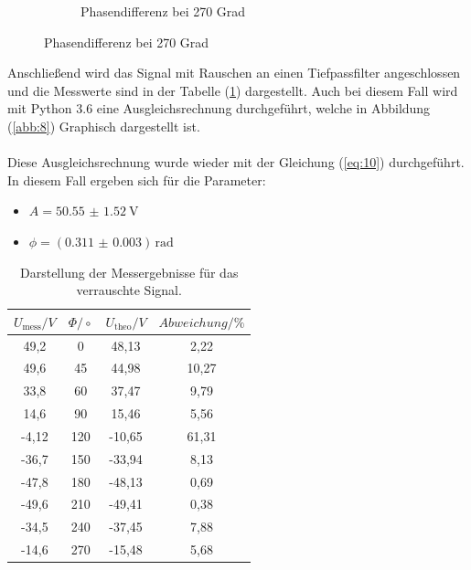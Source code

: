 \begin{figure}[H]
\begin{subfigure}{0.48\textwidth}
  \caption{Phasendifferenz bei 270 Grad}
\end{subfigure}
\end{figure}

Anschließend wird das Signal mit Rauschen an einen Tiefpassfilter angeschlossen und die
Messwerte sind in der Tabelle (\ref{tab:2}) dargestellt.
Auch bei diesem Fall wird mit Python 3.6 eine Ausgleichsrechnung durchgeführt,
welche in Abbildung (\ref{abb:8}) Graphisch dargestellt ist.\\\\

Diese Ausgleichsrechnung wurde wieder mit der Gleichung (\ref{eq:10}) durchgeführt.
In diesem Fall ergeben sich für die Parameter:

\begin{itemize}
	\item $A = \SI{50.55(152)}{\volt}$
	\item $\phi = (\num{0.311(3)}) \, \text{rad}$
\end{itemize}

\begin{table}[H]
\centering
\caption{Darstellung der Messergebnisse für das verrauschte Signal.}
\label{tab:2}
 \begin{tabular}{c c c c}
  \toprule
     $U_\text{mess} / V$ & $\Phi/\circ$ & $U_\text{theo} / V$ & $Abweichung/ \%$ \\
  \midrule
  49,2  & 0  & 	48,13 & 2,22 \\
  49,6  & 45 &  44,98 & 10,27 \\
  33,8  & 60 &  37,47 & 9,79 \\
  14,6  & 90 &  15,46 & 5,56 \\
  -4,12 & 120& -10,65 & 61,31 \\
  -36,7 & 150& -33,94 & 8,13 \\
  -47,8 & 180& -48,13 & 0,69 \\
  -49,6 & 210& -49,41 & 0,38 \\
  -34,5 & 240& -37,45 & 7,88 \\
  -14,6 & 270& -15,48 & 5,68 \\
  \bottomrule
\end{tabular}
\end{table}

